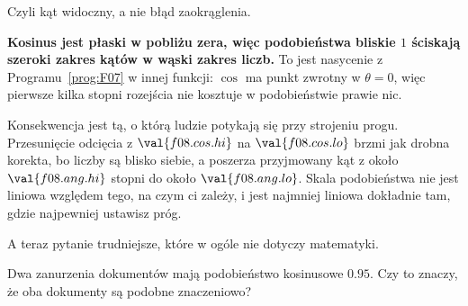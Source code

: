 \begin{fr}
Czyli kąt widoczny, a nie błąd zaokrąglenia.

\begin{trapbox}
\textbf{Kosinus jest płaski w pobliżu zera, więc podobieństwa bliskie $1$
ściskają szeroki zakres kątów w wąski zakres liczb.} To jest nasycenie z
Programu~\ref{prog:F07} w innej funkcji: $\cos$ ma punkt zwrotny w
$\theta = 0$, więc pierwsze kilka stopni rozejścia nie kosztuje w
podobieństwie prawie nic.

Konsekwencja jest tą, o którą ludzie potykają się przy strojeniu progu.
Przesunięcie odcięcia z $\val{f08.cos.hi}$ na $\val{f08.cos.lo}$ brzmi jak
drobna korekta, bo liczby są blisko siebie, a poszerza przyjmowany kąt z około
$\val{f08.ang.hi}$ stopni do około $\val{f08.ang.lo}$. Skala podobieństwa nie
jest liniowa względem tego, na czym ci zależy, i jest najmniej liniowa
dokładnie tam, gdzie najpewniej ustawisz próg.
\end{trapbox}
\end{fr}

\begin{fr}
A teraz pytanie trudniejsze, które w ogóle nie dotyczy matematyki.

Dwa zanurzenia dokumentów mają podobieństwo kosinusowe $\num{0.95}$. Czy to
znaczy, że oba dokumenty są podobne znaczeniowo?
\dotline
\nextframe
\end{fr}

